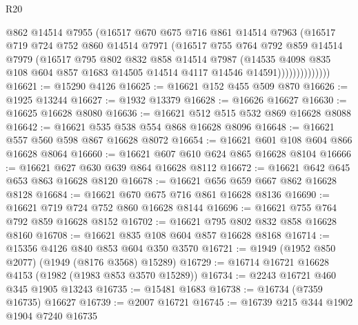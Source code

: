 \begin{lexlean}{R20}
\begin{coremodule}
                      @862
                      @14514
                      @7955
                      (@16517
                        @670
                        @675
                        @716
                        @861
                        @14514
                        @7963
                        (@16517
                          @719
                          @724
                          @752
                          @860
                          @14514
                          @7971
                          (@16517
                            @755
                            @764
                            @792
                            @859
                            @14514
                            @7979
                            (@16517
                              @795
                              @802
                              @832
                              @858
                              @14514
                              @7987
                              (@14535
                                @4098
                                @835
                                @108
                                @604
                                @857
                                @1683
                                @14505
                                @14514
                                @4117
                                @14546
                                @14591))))))))))))))
@16621 := @15290 @4126
@16625 := @16621 @152 @455 @509 @870
@16626 := @1925 @13244
@16627 := @1932 @13379
@16628 := @16626 @16627
@16630 := @16625 @16628 @8080
@16636 := @16621 @512 @515 @532 @869 @16628 @8088
@16642 := @16621 @535 @538 @554 @868 @16628 @8096
@16648 := @16621 @557 @560 @598 @867 @16628 @8072
@16654 := @16621 @601 @108 @604 @866 @16628 @8064
@16660 := @16621 @607 @610 @624 @865 @16628 @8104
@16666 := @16621 @627 @630 @639 @864 @16628 @8112
@16672 := @16621 @642 @645 @653 @863 @16628 @8120
@16678 := @16621 @656 @659 @667 @862 @16628 @8128
@16684 := @16621 @670 @675 @716 @861 @16628 @8136
@16690 := @16621 @719 @724 @752 @860 @16628 @8144
@16696 := @16621 @755 @764 @792 @859 @16628 @8152
@16702 := @16621 @795 @802 @832 @858 @16628 @8160
@16708 := @16621 @835 @108 @604 @857 @16628 @8168
@16714 := @15356 @4126 @840 @853 @604 @350 @3570
@16721 := @1949 (@1952 @850 @2077) (@1949 (@8176 @3568) @15289)
@16729 := @16714 @16721 @16628 @4153 (@1982 (@1983 @853 @3570 @15289))
@16734 := @2243 @16721 @460 @345 @1905 @13243
@16735 := @15481 @1683
@16738 := @16734 (@7359 @16735) @16627
@16739 := @2007 @16721
@16745 := @16739 @215 @344 @1902 @1904 @7240 @16735

\end{coremodule}
\end{lexlean}
